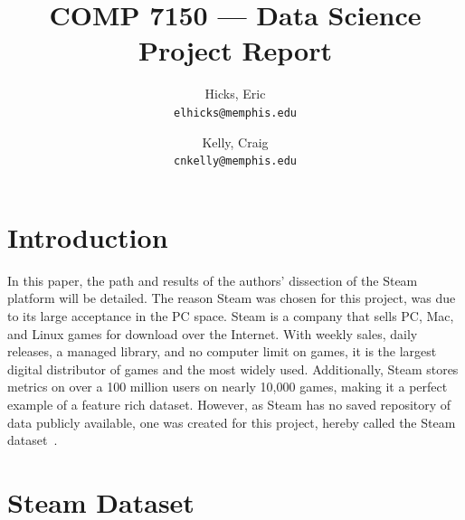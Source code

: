 \documentclass[letterpaper,10pt,twocolumn]{article}
\title{COMP 7150 --- Data Science Project Report}
\author{
    Hicks, Eric\\
    \texttt{elhicks@memphis.edu}
    \and
    Kelly, Craig\\
    \texttt{cnkelly@memphis.edu}
}
\begin{document}
\setlength{\pdfpageheight}{\paperheight}
\setlength{\pdfpagewidth}{\paperwidth}

\maketitle



\section{Introduction}

In this paper, the path and results of the authors' dissection of the Steam
platform will be detailed. The reason Steam was chosen for this project, was
due to its large acceptance in the PC space. Steam is a company that sells
PC, Mac, and Linux games for download over the Internet. With weekly sales,
daily releases, a managed library, and no computer limit on games, it is the
largest digital distributor of games and the most widely used. Additionally,
Steam stores metrics on over a 100 million users on nearly 10,000 games,
making it a perfect example of a feature rich dataset. However, as Steam has
no saved repository of data publicly available, one was created for this
project, hereby called the Steam dataset~\cite{steam}.



\section{Steam Dataset}
\end{document}

